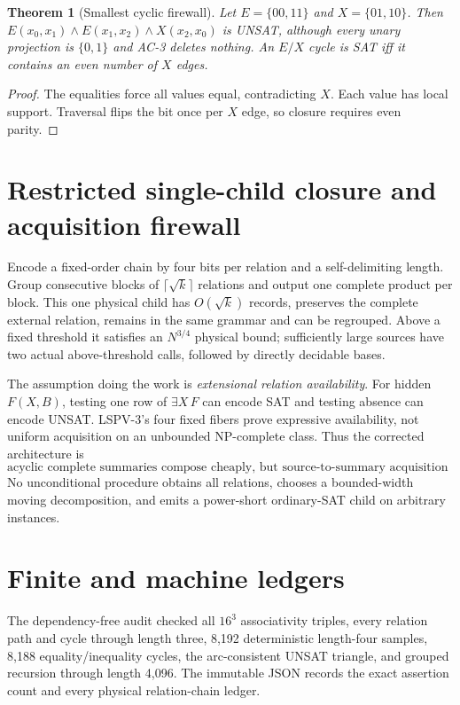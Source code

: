 \documentclass[11pt]{article}
\newtheorem{theorem}{Theorem}
\begin{document}
\begin{theorem}[Smallest cyclic firewall]
Let $E=\{00,11\}$ and $X=\{01,10\}$. Then
$E(x_0,x_1)\wedge E(x_1,x_2)\wedge X(x_2,x_0)$ is UNSAT, although every
unary projection is $\{0,1\}$ and AC-3 deletes nothing. An $E/X$ cycle is SAT
iff it contains an even number of $X$ edges.
\end{theorem}
\begin{proof}
The equalities force all values equal, contradicting $X$. Each value has
local support. Traversal flips the bit once per $X$ edge, so closure requires
even parity.
\end{proof}

\section{Restricted single-child closure and acquisition firewall}
Encode a fixed-order chain by four bits per relation and a self-delimiting
length. Group consecutive blocks of $\lceil\sqrt{k}\rceil$ relations and output
one complete product per block. This one physical child has
$O(\sqrt{k})$ records, preserves the complete external relation, remains in
the same grammar and can be regrouped. Above a fixed threshold it satisfies
an $N^{3/4}$ physical bound; sufficiently large sources have two actual
above-threshold calls, followed by directly decidable bases.

The assumption doing the work is \emph{extensional relation availability}.
For hidden $F(X,B)$, testing one row of $\exists X\,F$ can encode SAT and
testing absence can encode UNSAT. LSPV-3's four fixed fibers prove expressive
availability, not uniform acquisition on an unbounded NP-complete class.
Thus the corrected architecture is
\[
\boxed{\text{acyclic complete summaries compose cheaply, but
source-to-summary acquisition is the load-bearing open edge.}}
\]
No unconditional procedure obtains all relations, chooses a bounded-width
moving decomposition, and emits a power-short ordinary-SAT child on arbitrary
instances.

\section{Finite and machine ledgers}
The dependency-free audit checked all $16^3$ associativity triples, every
relation path and cycle through length three, 8,192 deterministic length-four
samples, 8,188 equality/inequality cycles, the arc-consistent UNSAT triangle,
and grouped recursion through length 4,096. The immutable JSON records the
exact assertion count and every physical relation-chain ledger.
\end{document}
